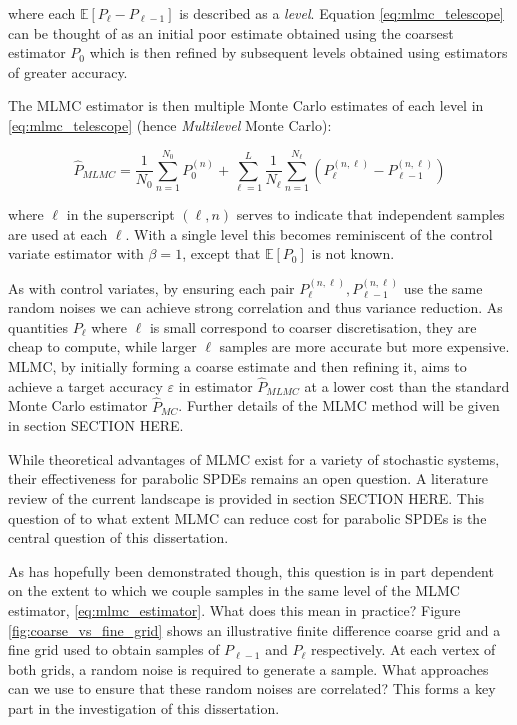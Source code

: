 where each $\mathbb{E}[P_\ell - P_{\ell - 1}]$ is described as a \textit{level}. 
Equation \eqref{eq:mlmc_telescope} can be thought of as an initial poor 
estimate obtained using the coarsest estimator $P_0$ which is then refined 
by subsequent levels obtained using estimators of greater accuracy.

The MLMC estimator is then multiple Monte Carlo estimates of each
level in \eqref{eq:mlmc_telescope} (hence \textit{Multilevel} Monte Carlo):

\begin{equation}\label{eq:mlmc_estimator}
    \hat{P}_{MLMC} = \frac{1}{N_0} \sum_{n=1}^{N_0} P_0^{(n)} + 
    \sum_{\ell=1}^L \frac{1}{N_\ell} \sum_{n=1}^{N_\ell} \left(P_\ell^{(n,\ell)} - P_{\ell - 1}^{(n,\ell)}\right)
\end{equation}

where $\ell$ in the superscript $(\ell, n)$ serves to indicate that independent samples 
are used at each $\ell$. With a single level this becomes reminiscent of the 
control variate estimator with $\beta = 1$, 
except that $\mathbb{E}[P_0]$ is not known. 

As with control variates, by ensuring each pair 
$P_\ell^{(n,\ell)}, P_{\ell - 1}^{(n,\ell)}$ use the 
same random noises we can achieve strong correlation and thus 
variance reduction. As quantities $P_\ell$ where $\ell$ is small correspond 
to coarser discretisation, they are cheap to compute, while larger 
$\ell$ samples are more accurate but more expensive. MLMC, 
by initially forming a coarse estimate and then refining it, aims to 
achieve a target accuracy $\varepsilon$ in estimator $\hat{P}_{MLMC}$ 
at a lower cost than the standard Monte Carlo estimator $\hat{P}_{MC}$. 
Further details of the MLMC method will be given in section SECTION HERE.

While theoretical advantages of MLMC exist for a variety of stochastic 
systems, their effectiveness for parabolic SPDEs remains an open question. A 
literature review of the current landscape is provided in section
SECTION HERE. This question of to what extent MLMC can reduce cost
for parabolic SPDEs is the central question of this dissertation.

As has hopefully been demonstrated though, this question is in part dependent 
on the extent to which we couple samples in the same level of the MLMC
estimator, \eqref{eq:mlmc_estimator}. What does this mean in practice? 
Figure \ref{fig:coarse_vs_fine_grid} shows an illustrative finite difference 
coarse grid and a fine grid
used to obtain samples of $P_{\ell - 1}$ and $P_\ell$ respectively.
At each vertex of both grids, a random noise is required to generate a sample.
What approaches can we use to ensure that these random noises are correlated?
This forms a key part in the investigation of this dissertation.

